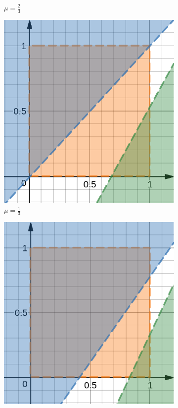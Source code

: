 \begin{flushleft}
\begin{figure}[H]
\begin{subfigure}[b]{0.22 \textwidth}
        	\caption{$\mu=\frac{2}{3}$}
        	\label{fig:three sin x}
     	\end{subfigure}
     	\hfill
     	\begin{subfigure}[b]{0.22 \textwidth}
        	\centering
        	\includegraphics[width=\textwidth]{images/graf_6_3}
        	\caption{$\mu=\frac{1}{3}$}
        	\label{fig:five over x}
     	\end{subfigure}
     	\hfill
     	\begin{subfigure}[b]{0.22 \textwidth}
        	\centering
        	\includegraphics[width=\textwidth]{images/graf_6_4}

\end{subfigure}
\end{figure}
\end{flushleft}
